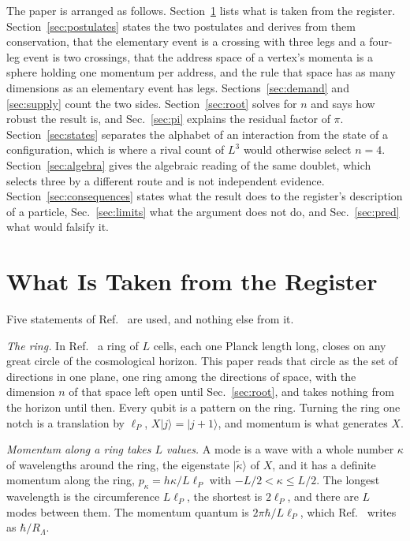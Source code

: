 \documentclass[aps,prd,twocolumn,superscriptaddress,nofootinbib]{revtex4-2}
\begin{document}
The paper is arranged as follows. Section~\ref{sec:register} lists what is taken from the register. Section~\ref{sec:postulates} states the two postulates and derives from them conservation, that the elementary event is a crossing with three legs and a four-leg event is two crossings, that the address space of a vertex's momenta is a sphere holding one momentum per address, and the rule that space has as many dimensions as an elementary event has legs. Sections~\ref{sec:demand} and \ref{sec:supply} count the two sides. Section~\ref{sec:root} solves for $n$ and says how robust the result is, and Sec.~\ref{sec:pi} explains the residual factor of $\pi$. Section~\ref{sec:states} separates the alphabet of an interaction from the state of a configuration, which is where a rival count of $L^3$ would otherwise select $n = 4$. Section~\ref{sec:algebra} gives the algebraic reading of the same doublet, which selects three by a different route and is not independent evidence. Section~\ref{sec:consequences} states what the result does to the register's description of a particle, Sec.~\ref{sec:limits} what the argument does not do, and Sec.~\ref{sec:pred} what would falsify it.

\section{What Is Taken from the Register}
\label{sec:register}

Five statements of Ref.~\cite{korytko2026c} are used, and nothing else from it.

\textit{The ring.} In Ref.~\cite{korytko2026c} a ring of $L$ cells, each one Planck length long, closes on any great circle of the cosmological horizon. This paper reads that circle as the set of directions in one plane, one ring among the directions of space, with the dimension $n$ of that space left open until Sec.~\ref{sec:root}, and takes nothing from the horizon until then. Every qubit is a pattern on the ring. Turning the ring one notch is a translation by $\ell_P$, $X|j\rangle = |j+1\rangle$, and momentum is what generates $X$.

\textit{Momentum along a ring takes $L$ values.} A mode is a wave with a whole number $\kappa$ of wavelengths around the ring, the eigenstate $|\tilde\kappa\rangle$ of $X$, and it has a definite momentum along the ring, $p_\kappa = h\kappa/L\ell_P$ with $-L/2 < \kappa \le L/2$. The longest wavelength is the circumference $L\ell_P$, the shortest is $2\ell_P$, and there are $L$ modes between them. The momentum quantum is $2\pi\hbar/L\ell_P$, which Ref.~\cite{korytko2026c} writes as $\hbar/R_\Lambda$.
\end{document}
